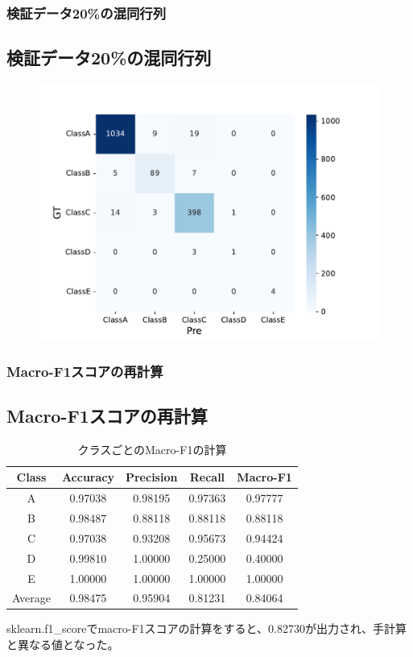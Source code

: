\documentclass[leno,xcolor=dvipsnames]{beamer}
\begin{document}
  \begin{frame}
    \frametitle{検証データ20\%の混同行列}
    \subsection{検証データ20\%の混同行列}
    \begin{figure}[H]
      \centering
      \includegraphics[keepaspectratio, scale=0.6]{images/DeepImFam_more_val.pdf}
    \end{figure}
  \end{frame}
  \begin{frame}
    \frametitle{Macro-F1スコアの再計算}
    \subsection{Macro-F1スコアの再計算}
    \begin{table}[H]
      \centering
      \caption{クラスごとのMacro-F1の計算} \label{tb:macro-F1}
      \begin{tabular}{ccccc}
        \toprule
        Class & Accuracy & Precision & Recall & Macro-F1 \\
        \midrule
        A & 0.97038 & 0.98195 & 0.97363 & 0.97777 \\
        B & 0.98487 & 0.88118 & 0.88118 & 0.88118 \\
        C & 0.97038 & 0.93208 & 0.95673 & 0.94424 \\
        D & 0.99810 & 1.00000 & 0.25000 & 0.40000 \\
        E & 1.00000 & 1.00000 & 1.00000 & 1.00000 \\
        \midrule
        Average & 0.98475 & 0.95904 & 0.81231 & 0.84064 \\
        \bottomrule
      \end{tabular}
    \end{table}
    sklearn.f1\_scoreでmacro-F1スコアの計算をすると、0.82730が出力され、手計算と異なる値となった。
  \end{frame}
\end{document}

